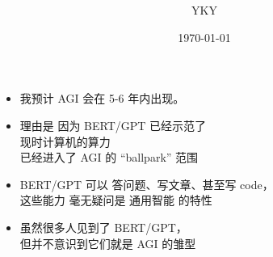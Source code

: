 

\usepackage{color}
\usepackage{mathtools}
\usepackage{hyperref}

%

\usepackage{graphicx} %
\usepackage{tikz-cd}
\usepackage{tikz}
\usepackage[export]{adjustbox}%
\usepackage{verbatim} %


\newcommand{\underdash}[1]{%
	\tikz[baseline=(toUnderline.base)]{
		\node[inner sep=1pt,outer sep=10pt] (toUnderline) {#1};
		\draw[dashed] ([yshift=-0pt]toUnderline.south west) -- ([yshift=-0pt]toUnderline.south east);
	}%
}%


\newcommand{\highlight}[1]{\colorbox{pink}{$\displaystyle #1$}}

\newcommand{\emp}[1]{{\color{blue}\textbf{#1}}}
\newcommand*\confoundFace{$\vcenter{\hbox{\texttt{[image: ../2020/../confounded-face.jpg]}}}$}
\newcommand{\underconst}{\texttt{[image: ../2020/UnderConst.png]}}
\newcommand{\witness}{\scalebox{0.6}{$\blacksquare$}}
\providecommand\Heytingarrow{\relbar\joinrel\mathrel{\vcenter{\hbox{\scalebox{0.75}{$\rhd$}}}}}



\title{\bfseries\color{blue}{\Huge《AGI in 5 minutes》}}
\author{YKY} %
\date{\today} %

\maketitle
{}

\begin{itemize}
	\item 我预计 AGI 会在 5-6 年内出现。
	\item 理由是 因为 BERT/GPT 已经示范了 \\
		 现时计算机的算力 \\
		 已经进入了 AGI 的 ``ballpark'' 范围
	\item BERT/GPT 可以 答问题、写文章、甚至写 code，\\
		这些能力 毫无疑问是 通用智能 的特性
	\item 虽然很多人见到了 BERT/GPT，\\
		但并不意识到它们就是 AGI 的雏型
\end{itemize}

